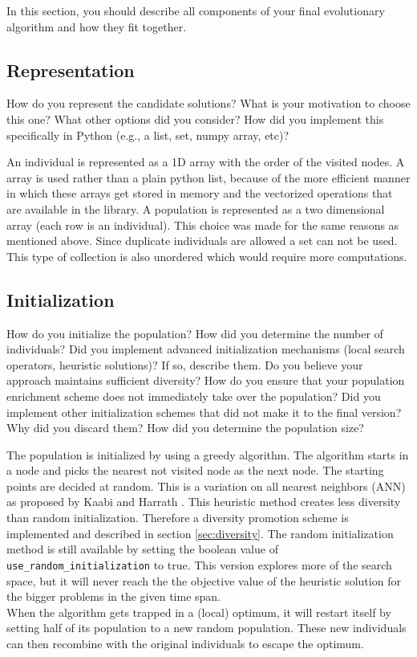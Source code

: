 \documentclass[a4paper,10pt]{article}
\newcommand{\ReplaceMe}[1]{{\color{blue}#1}}
\begin{document}
\ReplaceMe{In this section, you should describe all components of your final evolutionary algorithm and how they fit together.}

\subsection{Representation}

\ReplaceMe{How do you represent the candidate solutions? What is your motivation to choose this one? What other options did you consider? How did you implement this specifically in Python (e.g., a list, set, numpy array, etc)?}

An individual is represented as a 1D  array with the order of the visited nodes. A  array is used rather than a plain python list, because of the more efficient manner in which these arrays get stored in memory and the vectorized operations that are available in the  library. A population is represented as a two dimensional array (each row is an individual). This choice was made for the same reasons as mentioned above. Since duplicate individuals are allowed a set can not be used. This type of collection is also unordered which would require more computations.

\subsection{Initialization}

\ReplaceMe{How do you initialize the population? How did you determine the number of individuals? Did you implement advanced initialization mechanisms (local search operators, heuristic solutions)? If so, describe them. Do you believe your approach maintains sufficient diversity? How do you ensure that your population enrichment scheme does not immediately take over the population? Did you implement other initialization schemes that did not make it to the final version? Why did you discard them? How did you determine the population size?}

The population is initialized by using a greedy algorithm. The algorithm starts in a node and picks the nearest not visited node as the next node. The starting points are decided at random. This is a variation on all nearest neighbors (ANN) as proposed by Kaabi and Harrath \cite{ann}. This heuristic method creates less diversity than random initialization. Therefore a diversity promotion scheme is implemented and described in section \ref{sec:diversity}. The random initialization method is still available by setting the boolean value of \texttt{use\_random\_initialization} to true. This version explores more of the search space, but it will never reach the the objective value of the heuristic solution for the bigger problems in the given time span.\\
When the algorithm gets trapped in a (local) optimum, it will restart itself by setting half of its population to a new random population. These new individuals can then recombine with the original individuals to escape the optimum.
\end{document}
